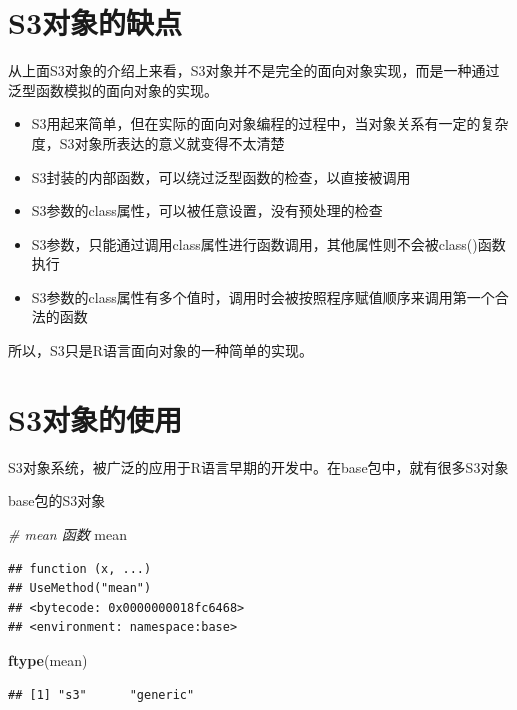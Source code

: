 \documentclass[]{book}
\newenvironment{Shaded}{\begin{snugshade}}{\end{snugshade}}
\newcommand{\KeywordTok}[1]{\textcolor[rgb]{0.13,0.29,0.53}{\textbf{#1}}}
\newcommand{\CommentTok}[1]{\textcolor[rgb]{0.56,0.35,0.01}{\textit{#1}}}
\newcommand{\NormalTok}[1]{#1}
\begin{document}
\section{S3对象的缺点}\label{s3}

从上面S3对象的介绍上来看，S3对象并不是完全的面向对象实现，而是一种通过泛型函数模拟的面向对象的实现。

\begin{itemize}
\item
  S3用起来简单，但在实际的面向对象编程的过程中，当对象关系有一定的复杂度，S3对象所表达的意义就变得不太清楚
\item
  S3封装的内部函数，可以绕过泛型函数的检查，以直接被调用
\item
  S3参数的class属性，可以被任意设置，没有预处理的检查
\item
  S3参数，只能通过调用class属性进行函数调用，其他属性则不会被class()函数执行
\item
  S3参数的class属性有多个值时，调用时会被按照程序赋值顺序来调用第一个合法的函数
\end{itemize}

所以，S3只是R语言面向对象的一种简单的实现。

\section{S3对象的使用}\label{s3}

S3对象系统，被广泛的应用于R语言早期的开发中。在base包中，就有很多S3对象

base包的S3对象

\begin{Shaded}
\begin{Highlighting}[]
\CommentTok{# mean 函数}
\NormalTok{mean}
\end{Highlighting}
\end{Shaded}

\begin{verbatim}
## function (x, ...) 
## UseMethod("mean")
## <bytecode: 0x0000000018fc6468>
## <environment: namespace:base>
\end{verbatim}

\begin{Shaded}
\begin{Highlighting}[]
\KeywordTok{ftype}\NormalTok{(mean)}
\end{Highlighting}
\end{Shaded}

\begin{verbatim}
## [1] "s3"      "generic"
\end{verbatim}
\end{document}
